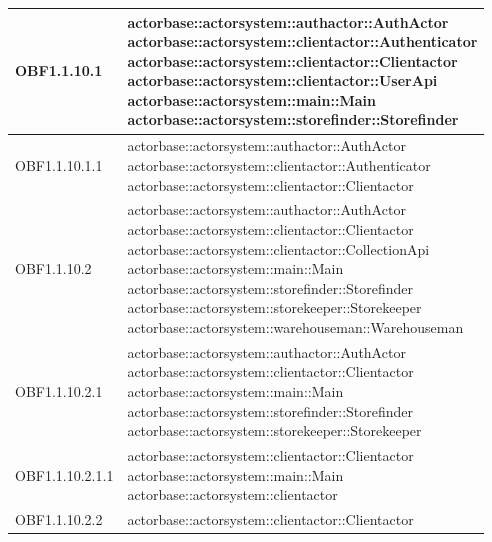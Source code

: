\documentclass{scalatekids-article}
\begin{document}
\begin{longtable}[H]{|p{5cm}|p{12cm}|}
\hline
OBF1.1.10.1 & \multiLineCell[t]{actorbase::actorsystem::authactor::AuthActor\\actorbase::actorsystem::clientactor::Authenticator\\actorbase::actorsystem::clientactor::Clientactor\\actorbase::actorsystem::clientactor::UserApi\\actorbase::actorsystem::main::Main\\actorbase::actorsystem::storefinder::Storefinder\\}\\
\hline
OBF1.1.10.1.1 & \multiLineCell[t]{actorbase::actorsystem::authactor::AuthActor\\actorbase::actorsystem::clientactor::Authenticator\\actorbase::actorsystem::clientactor::Clientactor\\}\\
\hline
OBF1.1.10.2 & \multiLineCell[t]{actorbase::actorsystem::authactor::AuthActor\\actorbase::actorsystem::clientactor::Clientactor\\actorbase::actorsystem::clientactor::CollectionApi\\actorbase::actorsystem::main::Main\\actorbase::actorsystem::storefinder::Storefinder\\actorbase::actorsystem::storekeeper::Storekeeper\\actorbase::actorsystem::warehouseman::Warehouseman\\}\\
\hline
OBF1.1.10.2.1 & \multiLineCell[t]{actorbase::actorsystem::authactor::AuthActor\\actorbase::actorsystem::clientactor::Clientactor\\actorbase::actorsystem::main::Main\\actorbase::actorsystem::storefinder::Storefinder\\actorbase::actorsystem::storekeeper::Storekeeper\\}\\
\hline
OBF1.1.10.2.1.1 & \multiLineCell[t]{actorbase::actorsystem::clientactor::Clientactor\\actorbase::actorsystem::main::Main\\actorbase::actorsystem::clientactor\\}\\
\hline
OBF1.1.10.2.2 & \multiLineCell[t]{actorbase::actorsystem::clientactor::Clientactor\\}\\

\end{longtable}
\end{document}
